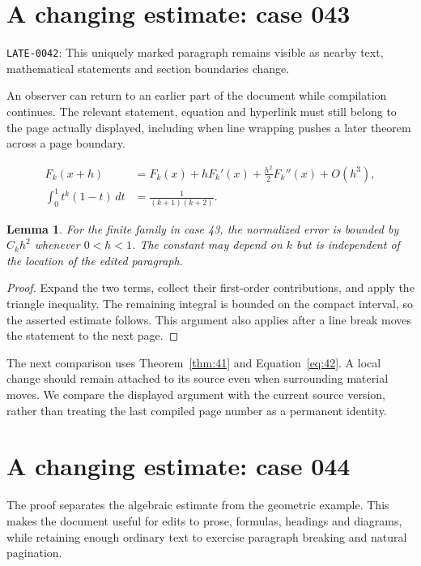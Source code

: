 \documentclass[a4paper,10pt]{article}
\newtheorem{lemma}[theorem]{Lemma}
\begin{document}
\lipsum[8]

\section{A changing estimate: case 043}\label{unit:42}
\hypertarget{varied:late}{}\label{anchor:late}
\noindent \texttt{LATE-0042}: This uniquely marked paragraph remains visible as nearby text, mathematical statements and section boundaries change.

An observer can return to an earlier part of the document while compilation continues. The relevant statement, equation and hyperlink must still belong to the page actually displayed, including when line wrapping pushes a later theorem across a page boundary.

\lipsum[7-8]
\begin{align}\label{eq:42}
 F_k(x+h)&=F_k(x)+hF_k'(x)+\frac{h^2}{2}F_k''(x)+O(h^3),\\
 \int_0^1 t^k(1-t)\,dt&=\frac{1}{(k+1)(k+2)}.
\end{align}
\begin{lemma}\label{thm:42}
For the finite family in case 43, the normalized error is bounded by $C_k h^2$ whenever $0<h<1$. The constant may depend on $k$ but is independent of the location of the edited paragraph.
\end{lemma}
\begin{proof}
Expand the two terms, collect their first-order contributions, and apply the
triangle inequality. The remaining integral is bounded on the compact interval,
so the asserted estimate follows. This argument also applies after a line break
moves the statement to the next page.
\end{proof}
The next comparison uses Theorem~\ref{thm:41} and Equation~\ref{eq:42}. A local change should remain attached to its source even when surrounding material moves. We compare the displayed argument with the current source version, rather than treating the last compiled page number as a permanent identity.

\lipsum[13]

\section{A changing estimate: case 044}\label{unit:43}
The proof separates the algebraic estimate from the geometric example. This makes the document useful for edits to prose, formulas, headings and diagrams, while retaining enough ordinary text to exercise paragraph breaking and natural pagination.
\end{document}
